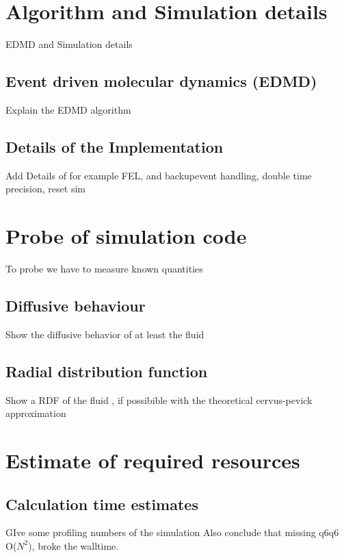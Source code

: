 
\label{chp:simulation}

\section{Algorithm and Simulation details}
\label{sec:simulation}
EDMD and Simulation details

\subsection{Event driven molecular dynamics (EDMD)}
\label{sec:EDMD}
Explain the EDMD algorithm

\subsection{Details of the Implementation} 
\label{sec:implemetation}
Add Details of for example FEL, and backupevent handling, double time precision, reset sim

\section{Probe of simulation code}
\label{sec:probe}
To probe we have to measure known quantities
\subsection{Diffusive behaviour}
\label{sec:diffusion_probe}
Show the diffusive behavior of at least the fluid

\subsection{Radial distribution function}
\label{sec:RDF_prob}
Show a RDF of the fluid , if possibible with the theoretical cervus-pevick approximation


\section{Estimate of required resources}
\label{sec:resources}

\subsection{Calculation time estimates}
\label{sec:calc_times}
GIve some profiling numbers of the simulation
Also conclude that missing q6q6 O($N^2$), broke the walltime.

